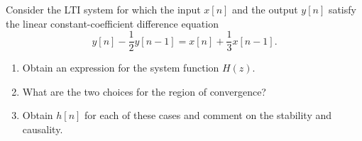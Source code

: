 \begin{frame}
    \begin{example}
        Consider the LTI system for which the input $x[n]$ and the output $y[n]$ satisfy the linear constant-coefficient difference equation
        \begin{equation*}
            y[n] - \frac{1}{2}y[n-1] = x[n] + \frac{1}{3}x[n-1].
        \end{equation*}
        \begin{enumerate}
            \item Obtain an expression for the system function $H(z)$.
            \item What are the two choices for the region of convergence?
            \item Obtain $h[n]$ for each of these cases and comment on the stability and causality.
        \end{enumerate}
    \end{example}
\end{frame} 